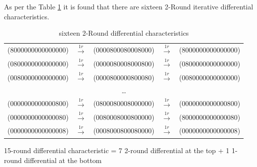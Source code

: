 \documentclass{transcrypto}
\begin{document}
	\newpage
	As per the Table \ref{162-round} it is found that there are sixteen 2-Round iterative differential characteristics. 
	\begin{table}[H]
		\centering
		\begin{tabular}{ccccc}
			(8000000000000000) & $\overset{1r}{\rightarrow}$ & (0000800080008000) & $\overset{1r}{\rightarrow}$ & (8000000000000000) \\
			
			(0800000000000000) & $\overset{1r}{\rightarrow}$ & (0000080008000800) & $\overset{1r}{\rightarrow}$ & (0800000000000000) \\
			
			(0080000000000000) & $\overset{1r}{\rightarrow}$ & (0000800000800080) & $\overset{1r}{\rightarrow}$ & (0080000000000000) \\
			
			& & \dots & & \\
			
			(0000000000000800) & $\overset{1r}{\rightarrow}$ & (0800080008000000) & $\overset{1r}{\rightarrow}$ & (0000000000000800) \\
			
			(0000000000000080) & $\overset{1r}{\rightarrow}$ & (0080008000800000) & $\overset{1r}{\rightarrow}$ & (8000000000000080) \\
			
			(0000000000000008) & $\overset{1r}{\rightarrow}$ & (0008000800080000) & $\overset{1r}{\rightarrow}$ & (0000000000000008) \\
		\end{tabular}
	\caption{sixteen 2-Round differential characteristics}
	\label{162-round}
	\end{table}
	15-round differential characteristic = 7 2-round differential at the top + 1 1-round differential at the bottom
	
\end{document}
